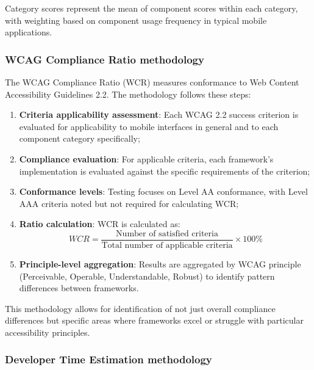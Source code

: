 Category scores represent the mean of component scores within each category, with weighting based on component usage frequency in typical mobile applications.

\subsubsection{WCAG Compliance Ratio methodology}
\label{subsubsec:wcr-methodology}

The WCAG Compliance Ratio (WCR) measures conformance to Web Content Accessibility Guidelines 2.2. The methodology follows these steps:

\begin{enumerate}
    \item \textbf{Criteria applicability assessment}: Each WCAG 2.2 success criterion is evaluated for applicability to mobile interfaces in general and to each component category specifically;
    
    \item \textbf{Compliance evaluation}: For applicable criteria, each framework's implementation is evaluated against the specific requirements of the criterion;
    
    \item \textbf{Conformance levels}: Testing focuses on Level AA conformance, with Level AAA criteria noted but not required for calculating WCR;
    
    \item \textbf{Ratio calculation}: WCR is calculated as:
    \begin{equation}
    WCR = \frac{\text{Number of satisfied criteria}}{\text{Total number of applicable criteria}} \times 100\%
    \end{equation}
    
    \item \textbf{Principle-level aggregation}: Results are aggregated by WCAG principle (Perceivable, Operable, Understandable, Robust) to identify pattern differences between frameworks.
\end{enumerate}

This methodology allows for identification of not just overall compliance differences but specific areas where frameworks excel or struggle with particular accessibility principles.

\subsubsection{Developer Time Estimation methodology}
\label{subsubsec:dte-methodology}

